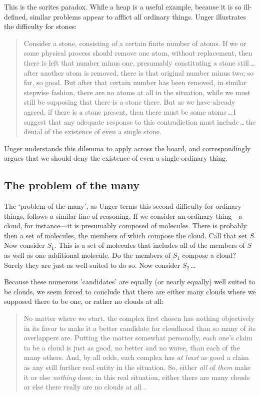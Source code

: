 \documentclass[11pt]{standalone} \newif\ifstandlone \standalonetrue
\newenvironment{squote}{%
	\begin{quote}\begin{singlespace}%
	}{%
	\end{singlespace}\end{quote}}
\begin{document}
\begin{spacing}{1.5}
This is the sorites paradox.  While a heap is a useful example,
because it is so ill-defined, similar problems appear to afflict all
ordinary things.  Unger illustrates the difficulty for stones:

\begin{squote}
Consider a stone, consisting of a certain finite number of atoms.  If
we or some physical process should remove one atom, without
replacement, then there is left that number minus one, presumably
constituting a stone still\,\ldots\,after another atom is removed,
there is that original number minus two; so far, so good.  But after
that certain number has been removed, in similar stepwise fashion,
there are no atoms at all in the situation, while we must still be
supposing that there is a stone there.  But as we have already agreed,
if there is a stone present, then there must be some atoms\,\ldots\,I
suggest that any adequate response to this contradiction must
include\,\ldots\,the denial of the existence of even a single
stone.~\citep[121--122]{unger1979}
\end{squote}
Unger understands this dilemma to apply across the board, and
correspondingly argues that we should deny the existence of even a
single ordinary thing.

\subsection{The problem of the many}
The `problem of the many', as Unger terms this second difficulty for
ordinary things, follows a similar line of reasoning.  If we consider
an ordinary thing---a cloud, for instance---it is presumably composed
of molecules.  There is probably then a set of molecules, the members
of which compose the cloud.  Call that set $S$.  Now consider $S_1$.
This is a set of molecules that includes all of the members of $S$ as
well as one additional molecule.  Do the members of $S_1$ compose a
cloud?  Surely they are just as well suited to do so.  Now consider
$S_2$\,\ldots

Because these numerous 'candidates' are equally (or nearly equally)
well suited to be clouds, we seem forced to conclude that there are
either many clouds where we supposed there to be one, or rather no
clouds at all:

\begin{squote}
No matter where we start, the complex first chosen has nothing
objectively in its favor to make it a better candidate for cloudhood
than so many of its overlappers are.  Putting the matter somewhat
personally, each one's claim to be a cloud is just as good, no better
and no worse, than each of the many others.  And, by all odds, each
complex has \emph{at least} as good a claim as any still further real
entity in the situation.  So, either \emph{all} of \emph{them} make it
or else \emph{nothing} does; in this real situation, either there are
many clouds or else there really are no clouds at all
\citep[415--??]{unger1980a}.
\end{squote}


\end{spacing}
\end{document}

